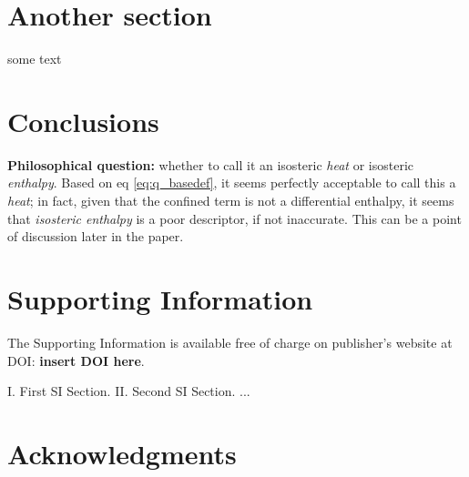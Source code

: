 \documentclass[preprint,pre,showkeys,12pt,superscriptaddress,nofootinbib]{revtex4-1}
\begin{document}
\section{Another section}
some text


\section{Conclusions}

{\bf Philosophical question:} whether to call it an isosteric {\it heat} or isosteric {\it enthalpy}.
Based on eq \ref{eq:q_basedef}, it seems perfectly acceptable to call this a {\it heat}; in fact, given that the confined term is not a differential enthalpy, it seems that {\it isosteric enthalpy} is a poor descriptor, if not inaccurate. This can be a point of discussion later in the paper.


\section*{Supporting Information}
The Supporting Information is available free of charge on {publisher's website} at DOI: {\bf insert DOI here}.

I. First SI Section. II. Second SI Section. ...

\section*{Acknowledgments}



%
\end{document}
